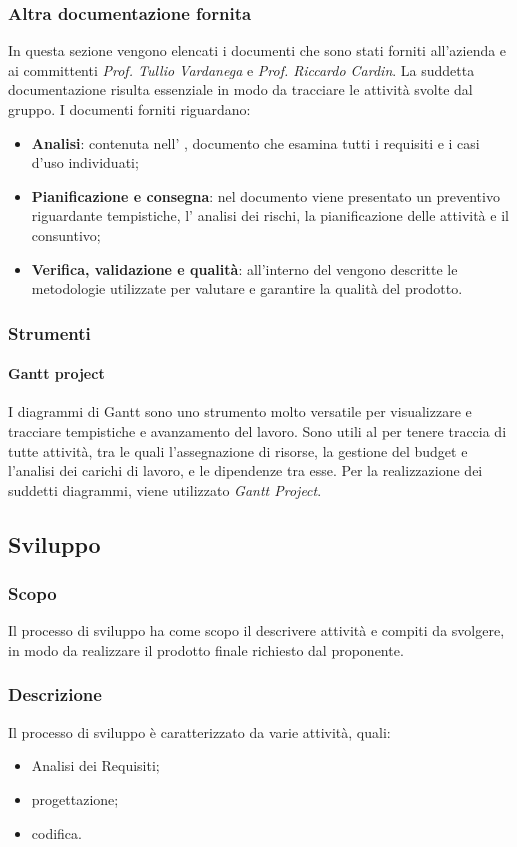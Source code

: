 \subsubsection{Altra documentazione fornita}
In questa sezione vengono elencati i documenti che sono stati forniti all'azienda \proponente{} e ai committenti \textit{Prof. Tullio Vardanega} e \textit{Prof. Riccardo Cardin}. La suddetta documentazione risulta essenziale in modo da tracciare le attività  svolte dal gruppo.
I documenti forniti riguardano: 
\begin{itemize}
	\item \textbf{Analisi}: contenuta nell' \AdR{}, documento che esamina tutti i requisiti e i casi d'uso individuati;
	\item \textbf{Pianificazione e consegna}: nel documento \PdP{} viene presentato un preventivo riguardante tempistiche, l' analisi dei rischi, la pianificazione delle attività e il consuntivo;
	\item \textbf{Verifica, validazione e qualità}: all'interno del \PdQ{} vengono descritte le metodologie utilizzate per valutare e garantire la qualità del prodotto.
\end{itemize}
\subsubsection{Strumenti}
\paragraph{Gantt project}
I diagrammi di Gantt sono uno strumento molto versatile per visualizzare e tracciare tempistiche e avanzamento del lavoro.  Sono utili al \RdP{} per tenere traccia di tutte attività, tra le quali l'assegnazione di risorse,  la gestione del budget e l'analisi dei carichi di lavoro, e le dipendenze tra esse. Per la realizzazione dei suddetti diagrammi, viene utilizzato \textit{Gantt Project}.
\subsection{Sviluppo}
\subsubsection{Scopo}
Il processo di sviluppo ha come scopo il descrivere attività e compiti da svolgere, in modo da realizzare il prodotto finale richiesto dal proponente.
\subsubsection{Descrizione}
Il processo di sviluppo è caratterizzato da varie attività,  quali:
\begin{itemize}
	\item Analisi dei Requisiti;
	\item progettazione;
	\item codifica.
\end{itemize}
